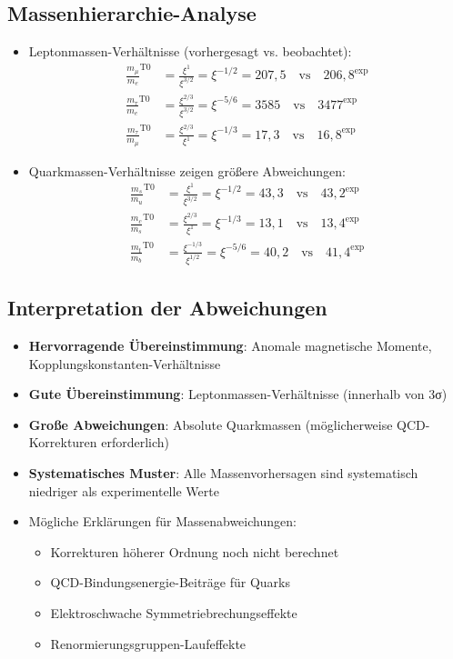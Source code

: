 \documentclass[12pt,a4paper]{article}
\begin{document}
\subsection{Massenhierarchie-Analyse}
\begin{itemize}
	\item Leptonmassen-Verhältnisse (vorhergesagt vs. beobachtet):
	\begin{align}
		\frac{m_\mu}{m_e}^{\text{T0}} &= \frac{\xi^1}{\xi^{3/2}} = \xi^{-1/2} = 207,5 \quad \text{vs} \quad 206,8^{\text{exp}} \\
		\frac{m_\tau}{m_e}^{\text{T0}} &= \frac{\xi^{2/3}}{\xi^{3/2}} = \xi^{-5/6} = 3585 \quad \text{vs} \quad 3477^{\text{exp}} \\
		\frac{m_\tau}{m_\mu}^{\text{T0}} &= \frac{\xi^{2/3}}{\xi^1} = \xi^{-1/3} = 17,3 \quad \text{vs} \quad 16,8^{\text{exp}}
	\end{align}
	
	\item Quarkmassen-Verhältnisse zeigen größere Abweichungen:
	\begin{align}
		\frac{m_s}{m_u}^{\text{T0}} &= \frac{\xi^1}{\xi^{3/2}} = \xi^{-1/2} = 43,3 \quad \text{vs} \quad 43,2^{\text{exp}} \\
		\frac{m_c}{m_s}^{\text{T0}} &= \frac{\xi^{2/3}}{\xi^1} = \xi^{-1/3} = 13,1 \quad \text{vs} \quad 13,4^{\text{exp}} \\
		\frac{m_t}{m_b}^{\text{T0}} &= \frac{\xi^{-1/3}}{\xi^{1/2}} = \xi^{-5/6} = 40,2 \quad \text{vs} \quad 41,4^{\text{exp}}
	\end{align}
\end{itemize}

\subsection{Interpretation der Abweichungen}
\begin{itemize}
	\item \textbf{Hervorragende Übereinstimmung}: Anomale magnetische Momente, Kopplungskonstanten-Verhältnisse
	\item \textbf{Gute Übereinstimmung}: Leptonmassen-Verhältnisse (innerhalb von 3σ)
	\item \textbf{Große Abweichungen}: Absolute Quarkmassen (möglicherweise QCD-Korrekturen erforderlich)
	\item \textbf{Systematisches Muster}: Alle Massenvorhersagen sind systematisch niedriger als experimentelle Werte
	
	\item Mögliche Erklärungen für Massenabweichungen:
	\begin{itemize}
		\item Korrekturen höherer Ordnung noch nicht berechnet
		\item QCD-Bindungsenergie-Beiträge für Quarks
		\item Elektroschwache Symmetriebrechungseffekte
		\item Renormierungsgruppen-Laufeffekte
	\end{itemize}
\end{itemize}
\end{document}
